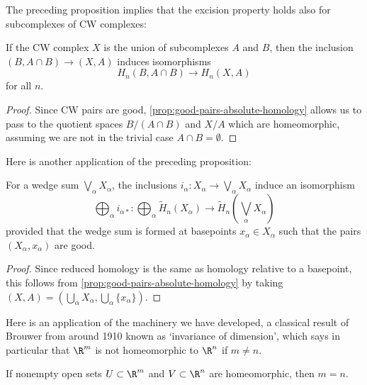 The preceding proposition implies that the excision property holds also for subcomplexes of CW complexes:

\begin{corollary}
\label{cor:excision-cw-subcomplexes}
If the CW complex $X$ is the union of subcomplexes $A$ and $B$, then the inclusion $(B, A \cap B) \to (X, A)$ induces isomorphisms
\[H_n(B, A \cap B) \to H_n(X, A)\]
for all $n$.
\end{corollary}

\begin{proof}
Since CW pairs are good, \cref{prop:good-pairs-absolute-homology} allows us to pass to the quotient spaces $B/(A \cap B)$ and $X/A$ which are homeomorphic, assuming we are not in the trivial case $A \cap B = \emptyset$.
\end{proof}
Here is another application of the preceding proposition:

\begin{corollary}
\label{cor:wedge-sum-direct-sum-homology}
For a wedge sum $\bigvee_\alpha X_\alpha$, the inclusions $i_\alpha: X_\alpha \to \bigvee_\alpha X_\alpha$ induce an isomorphism
\[\bigoplus_\alpha i_{\alpha*}:\bigoplus_\alpha \tilde{H}_n(X_\alpha) \to \tilde{H}_n\left(\bigvee_\alpha X_\alpha\right)\]
provided that the wedge sum is formed at basepoints $x_\alpha \in X_\alpha$ such that the pairs $(X_\alpha, x_\alpha)$ are good.
\end{corollary}

\begin{proof}
Since reduced homology is the same as homology relative to a basepoint, this follows from \cref{prop:good-pairs-absolute-homology} by taking $(X, A) = (\bigcup_\alpha X_\alpha, \bigcup_\alpha \{x_\alpha\})$.
\end{proof}
Here is an application of the machinery we have developed, a classical result of Brouwer from around 1910 known as `invariance of dimension', which says in particular that $\R^m$ is not homeomorphic to $\R^n$ if $m \ne n$.

\begin{theorem}
\label{thm:invariance-of-dimension}
If nonempty open sets $U \subset \R^m$ and $V \subset \R^n$ are homeomorphic, then $m = n$.
\end{theorem}

